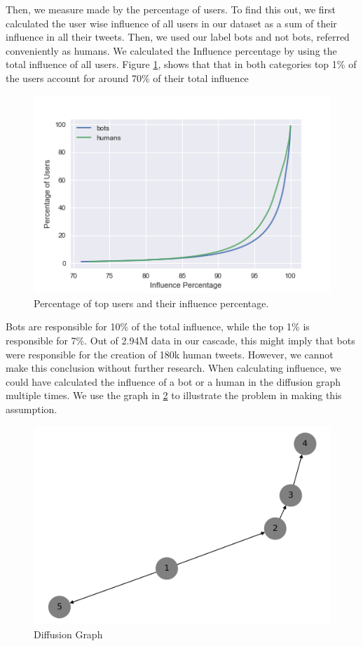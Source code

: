 \documentclass[letterpaper]{article}
\begin{document}
Then, we measure made by the percentage of users. To find this out, we first calculated the user wise 
influence of all users in our dataset as a sum of their influence in all their tweets. Then, we used our 
label bots and not bots, referred conveniently as humans. We calculated the Influence
 percentage by using the total influence of all users. Figure \ref{fig:top_infuence}, shows that 
that in both categories top 1\% of the users account for around 70\% of their total influence \par

\begin{figure}[H]
    \includegraphics[width=\linewidth]{images/top_percentages.png}
    \caption{Percentage of top users and their influence percentage.}
    \label{fig:top_infuence}
\end{figure}

Bots are responsible for 10\% of the total influence, while the top 1\% is responsible for 7\%. 
Out of 2.94M data in our cascade, this might imply 
that bots were responsible for the creation of 180k human tweets. However, we cannot make this conclusion 
without further research. When calculating influence, we could have calculated the influence of a bot or a
 human in the diffusion graph multiple times. We use the graph in \ref{fig:diff_graph} to illustrate 
the problem in making this assumption.

\begin{figure}[H]
    \includegraphics[width=\linewidth]{images/diffusion_graph.png}
    \caption{Diffusion Graph}
    \label{fig:diff_graph}
\end{figure}
\end{document}
